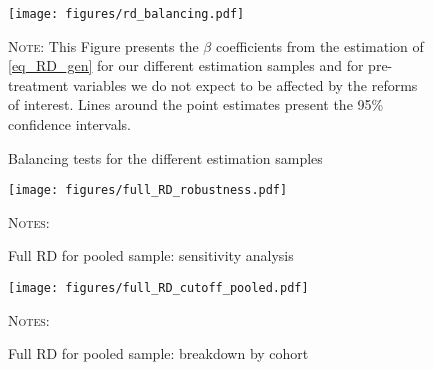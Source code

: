 \documentclass[12pt,a4paper]{article}
\begin{document}
\vspace{0.2cm}
\begin{figure}[H]
	\caption{Balancing tests for the different estimation samples}
	\label{fig_rd_balancing}
	\centering
	\texttt{[image: figures/rd\_balancing.pdf]} %
	\begin{minipage}{16cm}%
		\footnotesize
		\small \textsc{Note:} This Figure presents the $\beta$ coefficients from the estimation of \ref{eq_RD_gen} for our different estimation samples and for pre-treatment variables we do not expect to be affected by the reforms of interest. Lines around the point estimates present the 95\% confidence intervals. 
	\end{minipage}%
\end{figure}



\begin{figure}[H]
\begin{adjustwidth}{-1in}{-1in}	
\caption{Full RD for pooled sample: sensitivity analysis}
\label{full_RD_robustness}
\centering
\texttt{[image: figures/full\_RD\_robustness.pdf]}
\end{adjustwidth}
\begin{minipage}{15cm}%
\footnotesize
	\textsc{Notes:} 
\end{minipage}%
\end{figure}


\begin{figure}[H]
\begin{adjustwidth}{-1in}{-1in}	
\caption{Full RD for pooled sample: breakdown by cohort}
\label{full_RD_cohort}
\centering
\texttt{[image: figures/full\_RD\_cutoff\_pooled.pdf]}
\end{adjustwidth}
\begin{minipage}{15cm}%
\footnotesize
	\textsc{Notes:} 
\end{minipage}%
\end{figure}

\begin{comment}
    \begin{table}[H]	
	\caption{Full table for main analysis}
	\footnotesize
	\label{table_RD_full}
	\begin{adjustbox}{max width = \textwidth, max totalheight=.7\textheight, keepaspectratio}
		\hspace*{-1cm}
		
		\hspace*{-1cm}
	\end{adjustbox}
	\vspace*{0.2cm}
	\scriptsize
	\begin{tabular}{ll}
		\begin{minipage}{15cm}%
		\end{minipage}%
	\end{tabular}
	\normalsize
\end{table}
\end{comment}
\end{document}
